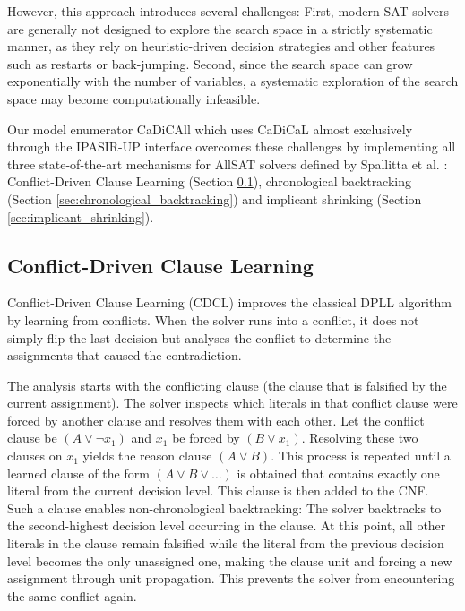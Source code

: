 \documentclass[12pt,a4paper]{article}
\begin{document}
However, this approach introduces several challenges: First, modern SAT solvers are generally not designed to explore the search space in a strictly systematic manner, as they rely on heuristic-driven decision strategies and other features such as restarts or back-jumping. Second, since the search space can grow exponentially with the number of variables, a systematic exploration of the search space may become computationally infeasible.

Our model enumerator CaDiCAll which uses CaDiCaL almost exclusively through the IPASIR-UP interface overcomes these challenges by implementing all three state-of-the-art mechanisms for AllSAT solvers defined by Spallitta et al. \citep{Spallitta_Sebastiani_Biere_2024}: Conflict-Driven Clause Learning (Section \ref{sec:cdcl}), chronological backtracking (Section \ref{sec:chronological_backtracking}) and implicant shrinking (Section \ref{sec:implicant_shrinking}).

\subsection{Conflict-Driven Clause Learning}
\label{sec:cdcl}

Conflict-Driven Clause Learning (CDCL) improves the classical DPLL algorithm by learning from conflicts. When the solver runs into a conflict, it does not simply flip the last decision but analyses the conflict to determine the assignments that caused the contradiction.

The analysis starts with the conflicting clause (the clause that is falsified by the current assignment). The solver inspects which literals in that conflict clause were forced by another clause and resolves them with each other. Let the conflict clause be \((A \lor \neg x_1)\) and \(x_1\) be forced by \((B \lor x_1)\). Resolving these two clauses on \(x_1\) yields the reason clause \((A \lor B)\). This process is repeated until a learned clause of the form \((A \lor B \lor \dots)\) is obtained that contains exactly one literal from the current decision level. This clause is then added to the CNF. Such a clause enables non-chronological backtracking: The solver backtracks to the second-highest decision level occurring in the clause. At this point, all other literals in the clause remain falsified while the literal from the previous decision level becomes the only unassigned one, making the clause unit and forcing a new assignment through unit propagation. This prevents the solver from encountering the same conflict again.
\end{document}
